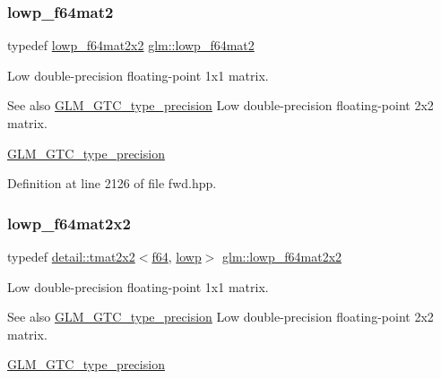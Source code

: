 \subsubsection{\texorpdfstring{lowp\+\_\+f64mat2}{lowp\_f64mat2}}
{\footnotesize\ttfamily typedef \hyperlink{group__gtc__type__precision_ga38e41c5332b4eb20b23b4ed1f06608d4}{lowp\+\_\+f64mat2x2} \hyperlink{group__gtc__type__precision_ga2984b3b0b6ee0657044d186bb875b4e3}{glm\+::lowp\+\_\+f64mat2}}

Low double-\/precision floating-\/point 1x1 matrix. \begin{DoxySeeAlso}{See also}
\hyperlink{group__gtc__type__precision}{G\+L\+M\+\_\+\+G\+T\+C\+\_\+type\+\_\+precision} Low double-\/precision floating-\/point 2x2 matrix. 

\hyperlink{group__gtc__type__precision}{G\+L\+M\+\_\+\+G\+T\+C\+\_\+type\+\_\+precision} 
\end{DoxySeeAlso}


Definition at line 2126 of file fwd.\+hpp.

\mbox{\label{group__gtc__type__precision_ga38e41c5332b4eb20b23b4ed1f06608d4}} 
\subsubsection{\texorpdfstring{lowp\+\_\+f64mat2x2}{lowp\_f64mat2x2}}
{\footnotesize\ttfamily typedef \hyperlink{structglm_1_1detail_1_1tmat2x2}{detail\+::tmat2x2}$<$\hyperlink{group__gtc__type__precision_ga2bba392e555124b36cde6abba349bab3}{f64}, \hyperlink{namespaceglm_a0f04f086094c747d227af4425893f545ae161af3fc695e696ce3bf69f7332bc2d}{lowp}$>$ \hyperlink{group__gtc__type__precision_ga38e41c5332b4eb20b23b4ed1f06608d4}{glm\+::lowp\+\_\+f64mat2x2}}

Low double-\/precision floating-\/point 1x1 matrix. \begin{DoxySeeAlso}{See also}
\hyperlink{group__gtc__type__precision}{G\+L\+M\+\_\+\+G\+T\+C\+\_\+type\+\_\+precision} Low double-\/precision floating-\/point 2x2 matrix. 

\hyperlink{group__gtc__type__precision}{G\+L\+M\+\_\+\+G\+T\+C\+\_\+type\+\_\+precision} 
\end{DoxySeeAlso}


